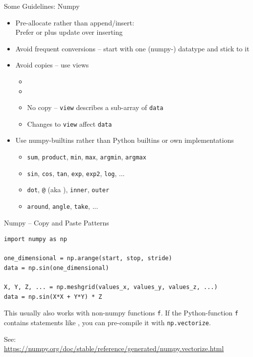 \begin{frame}{Some Guidelines: Numpy}
%
\begin{itemize}
\item Pre-allocate rather than append/insert:\\
	Prefer  or  plus update over inserting 
\item Avoid frequent conversions -- start with one (numpy-) datatype and stick to it
\item Avoid copies -- use views
	\begin{itemize}
	\item {}
	\item {}
	\item No copy -- \texttt{view} describes a sub-array of \texttt{data}
	\item Changes to \texttt{view} affect \texttt{data}
	\end{itemize}
\item Use numpy-builtins rather than Python builtins or own implementations
	\begin{itemize}
	\item \texttt{sum}, \texttt{product}, \texttt{min}, \texttt{max}, \texttt{argmin}, \texttt{argmax}
	\item \texttt{sin}, \texttt{cos}, \texttt{tan}, \texttt{exp}, \texttt{exp2}, \texttt{log}, ...
	\item \texttt{dot}, \texttt{@} (aka ), \texttt{inner}, \texttt{outer}
	\item \texttt{around}, \texttt{angle}, \texttt{take}, ...
	\end{itemize}
\end{itemize}
%
\end{frame}

%
\begin{frame}[fragile]{Numpy -- Copy and Paste Patterns}
%
\begin{codebox}
\begin{verbatim}
import numpy as np

one_dimensional = np.arange(start, stop, stride)
data = np.sin(one_dimensional)

X, Y, Z, ... = np.meshgrid(values_x, values_y, values_z, ...)
data = np.sin(X*X + Y*Y) * Z
\end{verbatim}
\end{codebox}
%
\begin{hintbox}
\small
This usually also works with non-numpy functions \texttt{f}.
If the Python-function \texttt{f} contains statements like , you can pre-compile it with \texttt{np.vectorize}.

\vspace{6pt}
See:\\
\url{https://numpy.org/doc/stable/reference/generated/numpy.vectorize.html}
\end{hintbox}
%
\end{frame}

